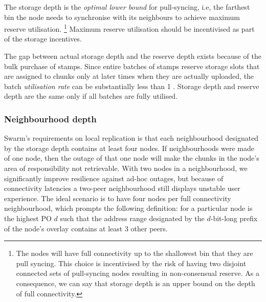 The storage depth is the \emph{optimal lower bound} for pull-syncing, i.e, the farthest bin the node needs to synchronise with its neighbours to achieve maximum reserve   utilisation.%
%
\footnote{The nodes will have full connectivity up to the shallowest bin that they are pull syncing. This choice is incentivised by the risk of having two disjoint connected sets of pull-syncing nodes resulting in non-consensual reserve. As a consequence, we can say that storage depth is an upper bound on the depth of full connectivity.}
%
Maximum reserve utilisation should be incentivised as part of the storage incentives. 







The gap between actual storage depth and the  reserve depth exists because of the bulk purchase of stamps. Since entire batches of stamps reserve storage slots that are assigned to  chunks only at later times when they are actually uploaded, the batch \emph{utilisation rate} can be substantially less than 1%
. Storage depth and reserve depth are the same only if all batches are fully utilised. 


\subsubsection{Neighbourhood depth}

Swarm's requirements on local replication is that each neighbourhood designated by the storage depth contains at least four nodes. 
If neighbourhoods were made of one node, then the outage of that one node will make  the chunks in the node's area of responsibility not retrievable.
With two nodes in a neighbourhood, we significantly improve resilience against ad-hoc outages, but because of connectivity latencies a two-peer neighbourhood still displays unstable user experience.
The ideal scenario is to have four nodes per full connectivity neighbourhood, which prompts the following definition:  for a particular node is the highest PO $d$ such that the address range designated by the $d$-bit-long prefix of the node's overlay contains at least 3 other peers.


